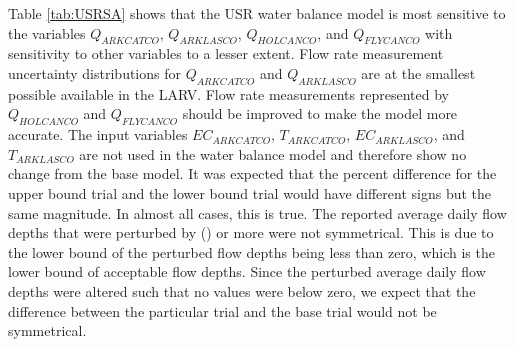 \begin{linenumbers}
Table \ref{tab:USRSA} shows that the USR water balance model is most sensitive to the variables $ Q_{ARKCATCO} $, $ Q_{ARKLASCO} $, $ Q_{HOLCANCO} $, and $ Q_{FLYCANCO} $ with sensitivity to other variables to a lesser extent.  Flow rate measurement uncertainty distributions for $ Q_{ARKCATCO} $ and $ Q_{ARKLASCO} $ are at the smallest possible available in the LARV.  Flow rate measurements represented by $ Q_{HOLCANCO} $ and $ Q_{FLYCANCO} $ should be improved to make the model more accurate.  The input variables $ EC_{ARKCATCO} $, $ T_{ARKCATCO} $, $ EC_{ARKLASCO} $, and $ T_{ARKLASCO} $ are not used in the water balance model and therefore show no change from the base model.  It was expected that the percent difference for the upper bound trial and the lower bound trial would have different signs but the same magnitude.  In almost all cases, this is true.  The reported average daily flow depths that were perturbed by  () or more were not symmetrical.  This is due to the lower bound of the perturbed flow depths being less than zero, which is the lower bound of acceptable flow depths.  Since the perturbed average daily flow depths were altered such that no values were below zero, we expect that the difference between the particular trial and the base trial would not be symmetrical.


\end{linenumbers}

